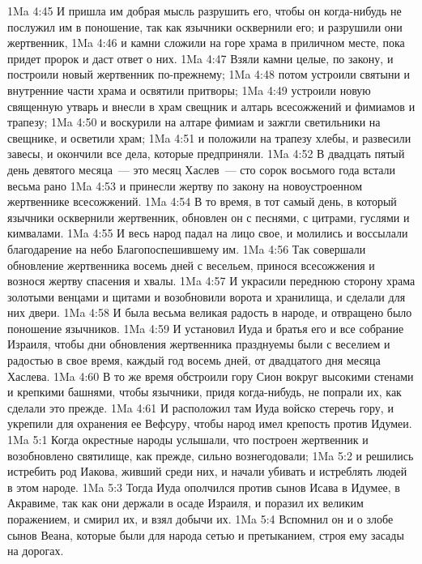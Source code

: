 \vs 1Ma 4:45 И пришла им добрая мысль разрушить его, чтобы он когда-нибудь не послужил им в поношение, так как язычники осквернили его; и разрушили они жертвенник,
\vs 1Ma 4:46 и камни сложили на горе храма в приличном месте, пока придет пророк и даст ответ о них.
\vs 1Ma 4:47 Взяли камни целые, по закону, и построили новый жертвенник по-прежнему;
\vs 1Ma 4:48 потом устроили святыни и внутренние части храма и освятили притворы;
\vs 1Ma 4:49 устроили новую священную утварь и внесли в храм свещник и алтарь всесожжений и фимиамов и трапезу;
\vs 1Ma 4:50 и воскурили на алтаре фимиам и зажгли светильники на свещнике, и осветили храм;
\vs 1Ma 4:51 и положили на трапезу хлебы, и развесили завесы, и окончили все дела, которые предприняли.
\rsbpar\vs 1Ma 4:52 В двадцать пятый день девятого месяца~--- это месяц Хаслев~--- сто сорок восьмого года встали весьма рано
\vs 1Ma 4:53 и принесли жертву по закону на новоустроенном жертвеннике всесожжений.
\vs 1Ma 4:54 В то время, в тот самый день, в который язычники осквернили жертвенник, обновлен он с песнями, с цитрами, гуслями и кимвалами.
\vs 1Ma 4:55 И весь народ падал на лицо свое, и молились и воссылали благодарение на небо Благопоспешившему им.
\vs 1Ma 4:56 Так совершали обновление жертвенника восемь дней с весельем, принося всесожжения и вознося жертву спасения и хвалы.
\vs 1Ma 4:57 И украсили переднюю сторону храма золотыми венцами и щитами и возобновили ворота и хранилища, и сделали для них двери.
\vs 1Ma 4:58 И была весьма великая радость в народе, и отвращено было поношение язычников.
\vs 1Ma 4:59 И установил Иуда и братья его и все собрание Израиля, чтобы дни обновления жертвенника празднуемы были с веселием и радостью в свое время, каждый год восемь дней, от двадцатого дня месяца Хаслева.
\vs 1Ma 4:60 В то же время обстроили гору Сион вокруг высокими стенами и крепкими башнями, чтобы язычники, придя когда-нибудь, не попрали их, как сделали это прежде.
\vs 1Ma 4:61 И расположил там Иуда войско стеречь гору, и укрепили для охранения ее Вефсуру, чтобы народ имел крепость против Идумеи.
\vs 1Ma 5:1 Когда окрестные народы услышали, что построен жертвенник и возобновлено святилище, как прежде, сильно вознегодовали;
\vs 1Ma 5:2 и решились истребить род Иакова, живший среди них, и начали убивать и истреблять людей в этом народе.
\vs 1Ma 5:3 Тогда Иуда ополчился против сынов Исава в Идумее, в Акравиме, так как они держали в осаде Израиля, и поразил их великим поражением, и смирил их, и взял добычи их.
\vs 1Ma 5:4 Вспомнил он и о злобе сынов Веана, которые были для народа сетью и претыканием, строя ему засады на дорогах.
